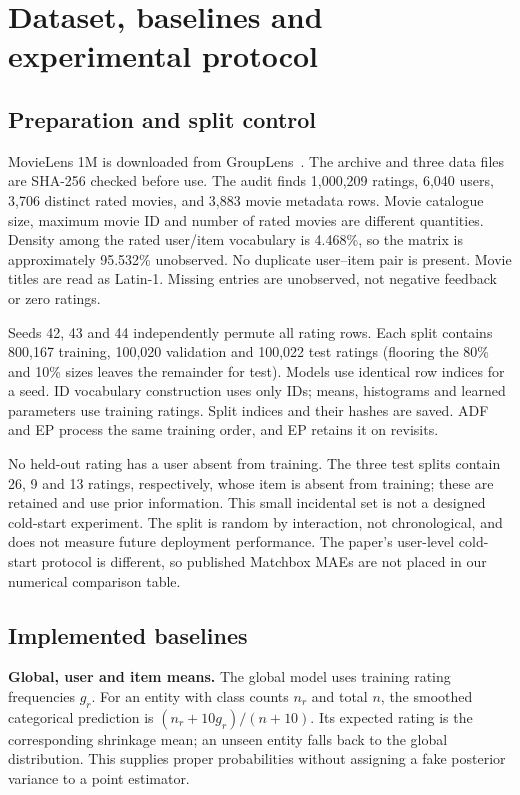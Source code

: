 \documentclass[11pt,a4paper]{article}
\begin{document}
\section{Dataset, baselines and experimental protocol}
\subsection{Preparation and split control}
MovieLens 1M is downloaded from GroupLens~\cite{movielens,harper2015}. The archive
and three data files are SHA-256 checked before use. The audit finds 1,000,209
ratings, 6,040 users, 3,706 distinct rated movies, and 3,883 movie metadata rows.
Movie catalogue size, maximum movie ID and number of rated movies are different
quantities. Density among the rated user/item vocabulary is 4.468\%, so the
matrix is approximately 95.532\% unobserved. No duplicate user--item pair is
present. Movie titles are read as Latin-1. Missing entries are unobserved,
not negative feedback or zero ratings.

Seeds 42, 43 and 44 independently permute all rating rows. Each split contains
800,167 training, 100,020 validation and 100,022 test ratings (flooring the
80\% and 10\% sizes leaves the remainder for test). Models use identical row
indices for a seed. ID vocabulary construction uses only IDs; means, histograms
and learned parameters use training ratings. Split indices and their hashes are
saved. ADF and EP process the same training order, and EP retains it on revisits.

No held-out rating has a user absent from training. The three test splits contain
26, 9 and 13 ratings, respectively, whose item is absent from training; these are
retained and use prior information. This small incidental set is not a designed
cold-start experiment. The split is random by interaction, not chronological,
and does not measure future deployment performance. The paper's user-level
cold-start protocol is different, so published Matchbox MAEs are not placed in
our numerical comparison table.

\subsection{Implemented baselines}
\textbf{Global, user and item means.} The global model uses training rating
frequencies $g_r$. For an entity with class counts $n_r$ and total $n$, the
smoothed categorical prediction is $(n_r+10g_r)/(n+10)$. Its expected rating is
the corresponding shrinkage mean; an unseen entity falls back to the global
distribution. This supplies proper probabilities without assigning a fake
posterior variance to a point estimator.
\end{document}
